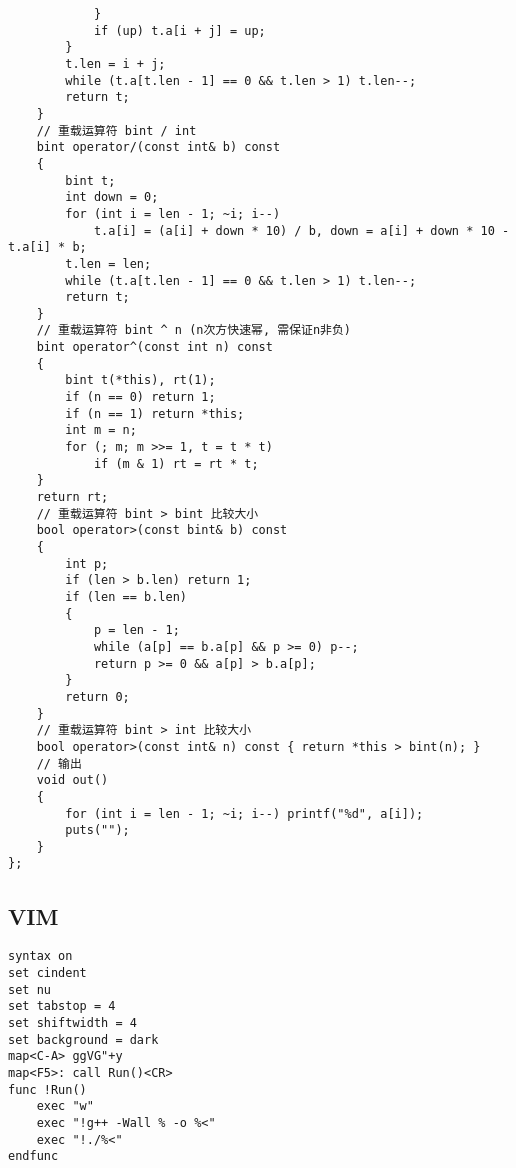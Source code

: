 \documentclass[twoside]{article}
\begin{document}
\begin{lstlisting}
            }
            if (up) t.a[i + j] = up;
        }
        t.len = i + j;
        while (t.a[t.len - 1] == 0 && t.len > 1) t.len--;
        return t;
    }
    // 重载运算符 bint / int
    bint operator/(const int& b) const
    {
        bint t;
        int down = 0;
        for (int i = len - 1; ~i; i--)
            t.a[i] = (a[i] + down * 10) / b, down = a[i] + down * 10 - t.a[i] * b;
        t.len = len;
        while (t.a[t.len - 1] == 0 && t.len > 1) t.len--;
        return t;
    }
    // 重载运算符 bint ^ n (n次方快速幂, 需保证n非负)
    bint operator^(const int n) const
    {
        bint t(*this), rt(1);
        if (n == 0) return 1;
        if (n == 1) return *this;
        int m = n;
        for (; m; m >>= 1, t = t * t)
            if (m & 1) rt = rt * t;
    }
    return rt;
    // 重载运算符 bint > bint 比较大小
    bool operator>(const bint& b) const
    {
        int p;
        if (len > b.len) return 1;
        if (len == b.len)
        {
            p = len - 1;
            while (a[p] == b.a[p] && p >= 0) p--;
            return p >= 0 && a[p] > b.a[p];
        }
        return 0;
    }
    // 重载运算符 bint > int 比较大小
    bool operator>(const int& n) const { return *this > bint(n); }
    // 输出
    void out()
    {
        for (int i = len - 1; ~i; i--) printf("%d", a[i]);
        puts("");
    }
};
\end{lstlisting}
\subsection{VIM}
\begin{lstlisting}
syntax on
set cindent
set nu
set tabstop = 4
set shiftwidth = 4
set background = dark
map<C-A> ggVG"+y
map<F5>: call Run()<CR>
func !Run()
    exec "w"
    exec "!g++ -Wall % -o %<"
    exec "!./%<"
endfunc
\end{lstlisting}
\end{document}
